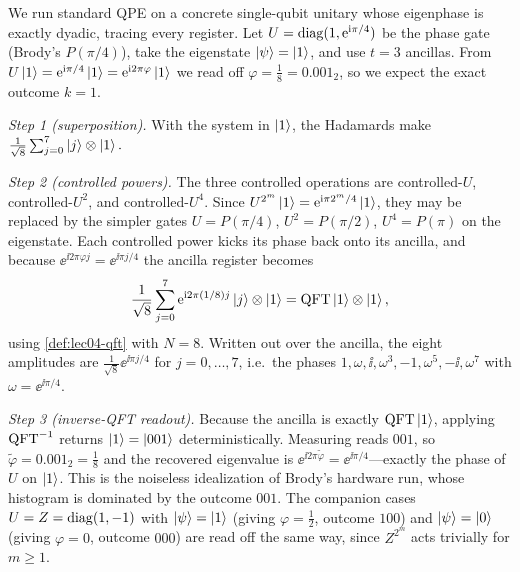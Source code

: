 \begin{example}
\label{exa:lec04-pgate}
We run standard QPE on a concrete single-qubit unitary whose eigenphase is
exactly dyadic, tracing every register. Let $U=\operatorname{diag}(1,\mathrm{e}^{\mathrm{i}\pi/4})$ be the
phase gate (Brody's $P(\pi/4)$), take the eigenstate $\ket{\psi}=\ket{1}$, and
use $t=3$ ancillas. From $U\ket{1}=\mathrm{e}^{\mathrm{i}\pi/4}\ket{1}=\mathrm{e}^{\mathrm{i} 2\pi\varphi}
\ket{1}$ we read off $\varphi=\tfrac18=0.001_2$, so we expect the exact outcome
$k=1$.

\emph{Step 1 (superposition).} With the system in $\ket{1}$, the Hadamards make
$
  \tfrac{1}{\sqrt8}\sum_{j=0}^{7}\ket{j}\otimes\ket{1}.
$

\emph{Step 2 (controlled powers).} The three controlled operations are
controlled-$U$, controlled-$U^{2}$, and controlled-$U^{4}$. Since
$U^{2^{m}}\ket{1}=\mathrm{e}^{\mathrm{i}\pi 2^{m}/4}\ket{1}$, they may be replaced by the
simpler gates $U=P(\pi/4)$, $U^{2}=P(\pi/2)$, $U^{4}=P(\pi)$ on the eigenstate.
Each controlled power kicks its phase back onto its ancilla, and because
$\ee^{\ii 2\pi\varphi j}=\ee^{\ii\pi j/4}$ the ancilla register becomes
\[
  \frac{1}{\sqrt8}\sum_{j=0}^{7}\mathrm{e}^{\mathrm{i} 2\pi(1/8)j}\ket{j}\otimes\ket{1}
  =\mathrm{QFT}\ket{1}\otimes\ket{1},
\]
using \cref{def:lec04-qft} with $N=8$. Written out over the ancilla, the eight
amplitudes are $\tfrac{1}{\sqrt8}\ee^{\ii\pi j/4}$ for $j=0,\dots,7$, i.e.\ the
phases $1,\omega,\ii,\omega^{3},-1,\omega^{5},-\ii,\omega^{7}$ with
$\omega=\ee^{\ii\pi/4}$.

\emph{Step 3 (inverse-QFT readout).} Because the ancilla is exactly
$\mathrm{QFT}\ket{1}$, applying $\mathrm{QFT}^{-1}$ returns $\ket{1}=\ket{001}$ deterministically.
Measuring reads $001$, so $\tilde\varphi=0.001_2=\tfrac18$ and the recovered
eigenvalue is $\ee^{\ii 2\pi\tilde\varphi}=\ee^{\ii\pi/4}$---exactly the phase of
$U$ on $\ket{1}$. This is the noiseless idealization of Brody's hardware run,
whose histogram is dominated by the outcome $001$. The companion cases
$U=Z=\operatorname{diag}(1,-1)$ with $\ket{\psi}=\ket{1}$ (giving $\varphi=\tfrac12$, outcome
$100$) and $\ket{\psi}=\ket{0}$ (giving $\varphi=0$, outcome $000$) are read off
the same way, since $Z^{2^{m}}$ acts trivially for $m\ge1$.
\end{example}

